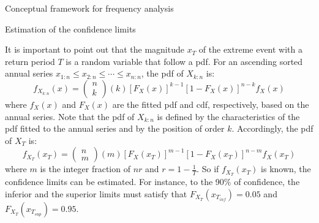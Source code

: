 \documentclass[8pt]{beamer}
\renewcommand{\emph}[1]{\textcolor{myorange}{#1}}
\begin{document}
\begin{frame}{Conceptual framework for  frequency analysis}
    \begin{block}{Estimation of the confidence limits}
\end{block}
        It is important to point out that the magnitude $x_T$ of the extreme event with a return period $T$ is a random variable that follow a \emph{pdf}. For an   ascending sorted annual series $x_{1:n} \leq x_{2:n} \leq \cdots \leq x_{n:n}$, the \emph{pdf} of $X_{k:n}$ is:
        \[
            f_{X_{k:n}} (x) = \left( \begin{array}{c} n \\ k \end{array} \right) (k)  \left[ F_X (x) \right]^{k-1} \left[ 1 - F_X (x) \right]^{n-k} f_X (x)
            \]
            where $f_X (x)$ and $F_X (x)$ are the fitted \emph{pdf} and \emph{cdf}, respectively, based on the annual series. Note that the \emph{pdf} of $X_{k:n}$ is defined by the characteristics of the \emph{pdf} fitted to the annual series and by the position of order $k$. Accordingly, the \emph{pdf} of $X_T$ is:
        \[
            f_{X_T } (x_T) = \left( \begin{array}{c} n \\ m \end{array} \right) (m)  \left[ F_X (x_T) \right]^{m-1} \left[ 1 - F_X (x_T) \right]^{n-m} f_X (x_T)
            \]
            where $m$ is the integer fraction of $nr$ and $r = 1 -\frac{1}{T}$. So if $f_{X_T} (x_T)$ is known, the confidence limits can be estimated. For instance, to the 90\% of confidence, the inferior and the superior limits must satisfy  that $F_{X_T} (x_{T_{inf}}) = 0.05$ and $F_{X_T} (x_{T_{sup}}) = 0.95$.                 

\end{frame}
\end{document}
